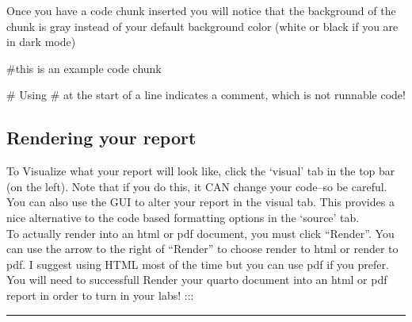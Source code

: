 \documentclass[
  letterpaper,
  DIV=11,
  numbers=noendperiod]{scrartcl}
\newenvironment{Shaded}{\begin{snugshade}}{\end{snugshade}}
\newcommand{\CommentTok}[1]{\textcolor[rgb]{0.37,0.37,0.37}{#1}}
\begin{document}
Once you have a code chunk inserted you will notice that the background
of the chunk is gray instead of your default background color (white or
black if you are in dark mode)

\begin{Shaded}
\begin{Highlighting}[]
\CommentTok{\#this is an example code chunk}

\CommentTok{\# Using \textquotesingle{}\#\textquotesingle{} at the start of a line indicates a comment, which is not runnable code!}
\end{Highlighting}
\end{Shaded}

\hypertarget{rendering-your-report}{%
\subsection{\texorpdfstring{\textbf{Rendering your
report}}{Rendering your report}}\label{rendering-your-report}}

To Visualize what your report will look like, click the `visual' tab in
the top bar (on the left). Note that if you do this, it CAN change your
code--so be careful. You can also use the GUI to alter your report in
the visual tab. This provides a nice alternative to the code based
formatting options in the `source' tab.\\

To actually render into an html or pdf document, you must click
``Render''. You can use the arrow to the right of ``Render'' to choose
render to html or render to pdf. I suggest using HTML most of the time
but you can use pdf if you prefer. You will need to successfull Render
your quarto document into an html or pdf report in order to turn in your
labs! :::

\begin{center}\rule{0.5\linewidth}{0.5pt}\end{center}
\end{document}
